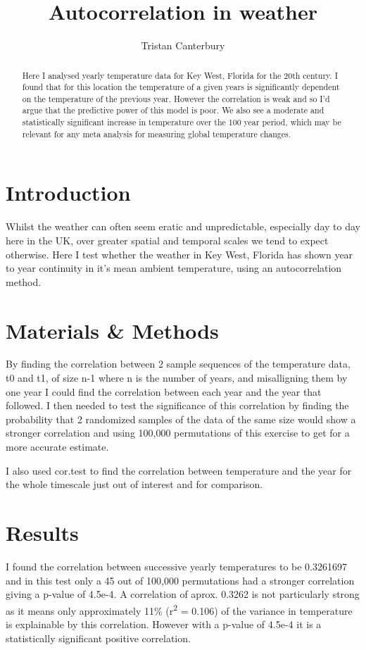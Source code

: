 \documentclass[12pt]{article}
\title{Autocorrelation in weather}
\author{Tristan Canterbury}
\date{}
\begin{document}
  \maketitle

  \begin{abstract}
    Here I analysed yearly temperature data for Key West, Florida for the 20th century. I found that for this location the temperature of a given years is significantly
    dependent on the temperature of the previous year. However the correlation is weak and so I'd argue that the predictive power of this model is poor. We also see
    a moderate and statistically significant increase in temperature over the 100 year period, which may be relevant for any meta analysis for measuring global temperature
    changes.

  \end{abstract}

  \section{Introduction}
    Whilst the weather can often seem eratic and unpredictable, especially day to day here in the UK, over greater spatial and temporal scales we tend to expect otherwise. 
    Here I test whether the weather in Key West, Florida has shown year to year continuity in it's mean ambient temperature, using an autocorrelation method. 


  \section{Materials \& Methods}
  By finding the correlation between 2 sample sequences of the temperature data, t0 and t1, of size n-1 where n is the number of years, and misalligning them 
  by one year I could find the correlation between each year and the year that followed. I then needed to test the significance of this correlation by finding 
  the probability that 2 randomized samples of the data of the same size would show a stronger correlation and using 100,000 permutations of this exercise to get 
  for a more accurate estimate.

  I also used cor.test to find the correlation between temperature and the year for the whole timescale just out of interest and for comparison.

  \section{Results}
  I found the correlation between successive yearly temperatures to be 0.3261697 and in this test only a 45 out of 100,000 permutations had a stronger correlation 
  giving a p-value of 4.5e-4. 
  A correlation of aprox. 0.3262 is not particularly strong as it means only approximately 11\% (r\textsuperscript{2} = 0.106) 
  of the variance in temperature is explainable by this correlation.
  However with a p-value of 4.5e-4 it is a statistically significant positive correlation.
\end{document}

